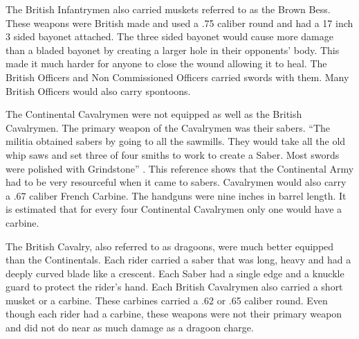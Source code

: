 The British Infantrymen also carried muskets referred to as the Brown Bess.
These weapons were British made and used a .75 caliber round and had a 17 inch 3
sided bayonet attached.  The three sided bayonet would cause more damage than a
bladed bayonet by creating a larger hole in their opponents’ body.  This made it
much harder for anyone to close the wound allowing it to heal.  The British
Officers and Non Commissioned Officers carried swords with them.  Many British
Officers would also carry spontoons.

The Continental Cavalrymen were not equipped as well as the British Cavalrymen.
The primary weapon of the Cavalrymen was their sabers.  “The militia obtained
sabers by going to all the sawmills.  They would take all the old whip saws and
set three of four smiths to work to create a Saber.  Most swords were polished
with Grindstone” \cite[p.21]{babits_devil_2001}.  This reference shows that the Continental Army
had to be very resourceful when it came to sabers.  Cavalrymen would also carry
a .67 caliber French Carbine.  The handguns were nine inches in barrel length.
It is estimated that for every four Continental Cavalrymen only one would have a
carbine.

The British Cavalry, also referred to as dragoons, were much better equipped
than the Continentals.  Each rider carried a saber that was long, heavy and had
a deeply curved blade like a crescent.  Each Saber had a single edge and a
knuckle guard to protect the rider’s hand.  Each British Cavalrymen also carried
a short musket or a carbine.  These carbines carried a .62 or .65 caliber round.
Even though each rider had a carbine, these weapons were not their primary
weapon and did not do near as much damage as a dragoon charge.

